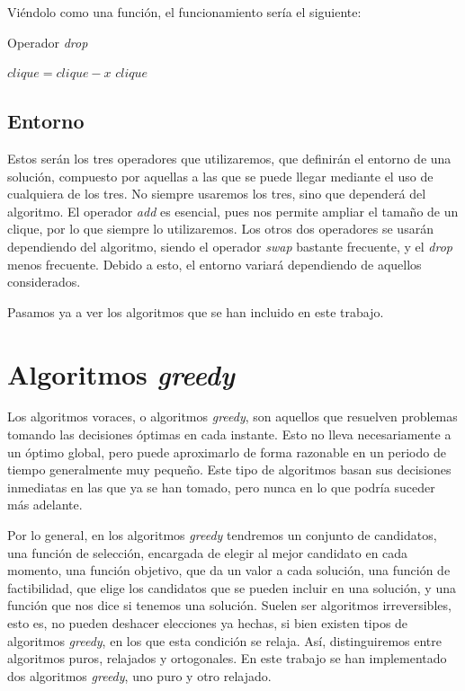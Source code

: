 Viéndolo como una función, el funcionamiento sería el siguiente:

\begin{algorithm}[H]
\caption{Operador \textit{drop}}
  \begin{algorithmic}
    \State $clique = clique - x$
    \Return $clique$
  \EndFunction
  \end{algorithmic}
\end{algorithm}


\subsection{Entorno}

Estos serán los tres operadores que utilizaremos, que definirán el entorno de una solución, compuesto por
aquellas a las que se puede llegar mediante el uso de cualquiera de los tres. No siempre usaremos los
tres, sino que dependerá del algoritmo. El operador \textit{add} es esencial, pues nos permite ampliar
el tamaño de un clique, por lo que siempre lo utilizaremos. Los otros dos operadores se usarán dependiendo
del algoritmo, siendo el operador \textit{swap} bastante frecuente, y el \textit{drop} menos frecuente.
Debido a esto, el entorno variará dependiendo de aquellos considerados.

Pasamos ya a ver los algoritmos que se han incluido en este trabajo.

\section{Algoritmos \textit{greedy}}\label{greedy}

Los algoritmos voraces, o algoritmos \textit{greedy}, son aquellos que resuelven problemas tomando
las decisiones óptimas en cada instante. Esto no lleva necesariamente a un óptimo global, pero puede
aproximarlo de forma razonable en un periodo de tiempo generalmente muy pequeño. Este tipo de algoritmos
basan sus decisiones inmediatas en las que ya se han tomado, pero nunca en lo que podría suceder más
adelante.

Por lo general, en los algoritmos \textit{greedy} tendremos un conjunto de candidatos, una función
de selección, encargada de elegir al mejor candidato en cada momento, una función objetivo, que
da un valor a cada solución, una función de factibilidad, que elige los candidatos que se pueden incluir
en una solución, y una función que nos dice si tenemos una solución. Suelen ser algoritmos irreversibles,
esto es, no pueden deshacer elecciones ya hechas, si bien existen tipos de algoritmos
\textit{greedy}, en los que esta condición se relaja. Así, distinguiremos entre algoritmos
puros, relajados y ortogonales. En este trabajo se han implementado dos algoritmos \textit{greedy},
uno puro y otro relajado.

